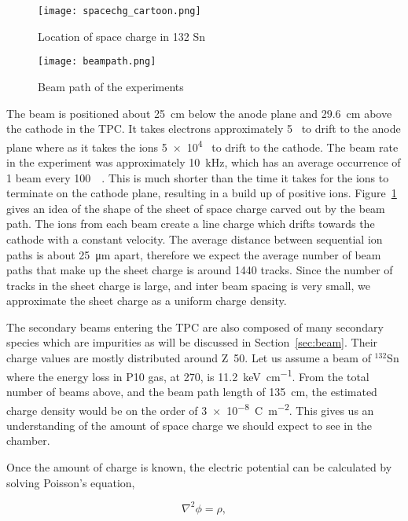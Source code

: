 \begin{figure}[!htb]
\centering
\texttt{[image: spacechg\_cartoon.png]}
\caption{Location of space charge in 132 Sn}
\label{fig:spacechg_cartoon}
\end{figure}


\begin{figure}[!htb]
\centering
\texttt{[image: beampath.png]}
\caption{Beam path of the experiments}
\label{fig:beampaths}
\end{figure}
 
 
 The beam is positioned about \SI{25}{\centi\metre} below the anode plane and \SI{29.6}{\centi\metre} above the cathode in the TPC. It takes electrons approximately 5\si{\micro\sec} to drift to the anode plane where as it takes the ions \num{5e4}\si{\micro\sec} to drift to the cathode. The beam rate in the experiment was approximately \SI{10}{\kilo\hertz}, which has an average occurrence of 1 beam every \SI{100}{\micro\sec}. This is  much shorter than the time it takes for the ions to terminate on the cathode plane, resulting in a build up of positive ions. Figure~\ref{fig:spacechg_cartoon} gives an idea of the shape of the sheet of space charge carved out by the beam path. The ions from each beam create a line charge which drifts towards the cathode with a constant velocity. The average distance between sequential ion paths is about \SI{25}{\micro\metre} apart, therefore we expect the average number of beam paths that make up the sheet charge is around \num{1440} tracks. Since the number of tracks in the sheet charge is large, and inter beam spacing is very small, we approximate the sheet charge as a uniform charge density. 
 
 The secondary beams entering the TPC are also composed of many secondary species which are impurities as will be discussed in Section~\ref{sec:beam}. Their charge values are mostly distributed around Z~50. Let us assume a beam of ${}^{132}$Sn where the energy loss in P10 gas, at \SI{270}{\MeVA}, is \SI{11.2}{\kilo\electronvolt\per\centi\metre}. From the total number of beams above, and the beam path length of \SI{135}{\centi\metre}, the estimated charge density would be on the order of \SI{3e-8}{\coulomb\per\metre\squared}. This gives us an understanding of the amount of space charge we should expect to see in the chamber. 
 

Once the amount of charge is known, the electric potential can be calculated by solving Poisson's equation, 

\begin{equation}
\nabla^2 \phi = \rho,
\end{equation}

